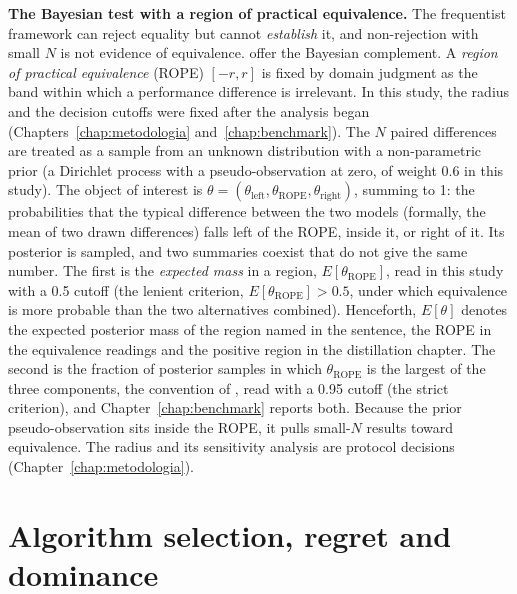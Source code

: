 \textbf{The Bayesian test with a region of practical equivalence.}
The frequentist framework can reject equality but cannot
\emph{establish} it, and non-rejection with small $N$ is not evidence of
equivalence. \citet{benavoli2017} offer the Bayesian complement. A
\emph{region of practical equivalence} (ROPE) $[-r, r]$ is fixed by
domain judgment as the band within which a performance difference is
irrelevant. In this study, the radius and the decision cutoffs were
fixed after the analysis began (Chapters~\ref{chap:metodologia}
and~\ref{chap:benchmark}). The $N$ paired differences are treated as
a sample from an unknown distribution with a non-parametric prior (a Dirichlet process with a pseudo-observation at zero, of weight 0.6 in this study). The object of interest is
$\theta = (\theta_{\text{left}}, \theta_{\text{ROPE}},
\theta_{\text{right}})$, summing to 1: the probabilities that the typical difference between the two models
(formally, the mean of two drawn differences) falls left of the ROPE,
inside it, or right of it. Its posterior is sampled, and
two summaries coexist that do not give the same number. The first is
the \emph{expected mass} in a region, $E[\theta_{\text{ROPE}}]$, read
in this study with a 0.5 cutoff (the lenient criterion, $E[\theta_{\text{ROPE}}]>0.5$, under which equivalence is more probable than the two alternatives combined). Henceforth, $E[\theta]$
denotes the expected posterior mass of the region named in the
sentence, the ROPE in the equivalence readings and the
positive region in the distillation chapter. The second is the
fraction of posterior samples in which $\theta_{\text{ROPE}}$ is the
largest of the three components, the convention of
\citet{benavoli2017}, read with a 0.95 cutoff (the strict criterion), and Chapter~\ref{chap:benchmark} reports both. Because the prior
pseudo-observation sits inside the ROPE, it pulls small-$N$ results
toward equivalence. The radius and its sensitivity analysis are
protocol decisions (Chapter~\ref{chap:metodologia}).

\section{Algorithm selection, regret and dominance}
\label{sec:fund-selecao}

